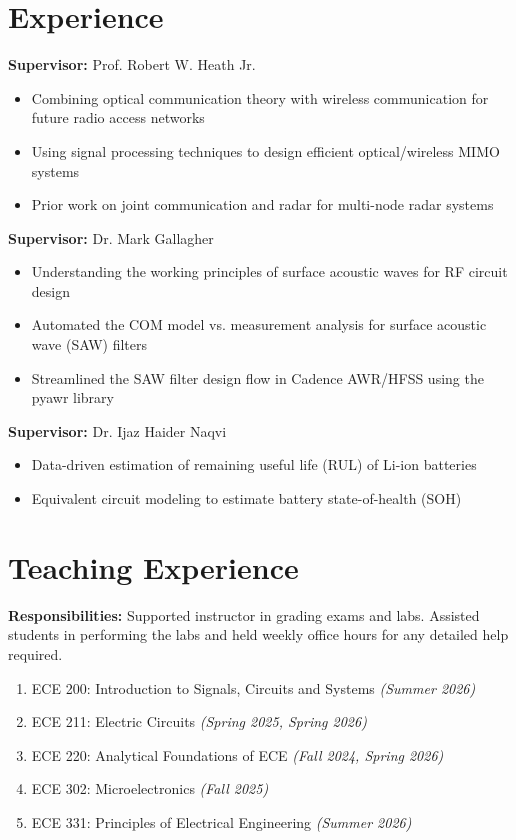 \documentclass[11pt,a4paper,sans]{moderncv}        %
\begin{document}
\section{Experience}

\textbf{Supervisor:} Prof. Robert W. Heath Jr.
\begin{itemize}
    \item Combining optical communication theory with wireless communication for future radio access networks
    \item Using signal processing techniques to design efficient optical/wireless MIMO systems
    \item Prior work on joint communication and radar for multi-node radar systems
\end{itemize}

\textbf{Supervisor:} Dr. Mark Gallagher
\begin{itemize}
    \item Understanding the working principles of surface acoustic waves for RF circuit design
    \item Automated the COM model vs. measurement analysis for surface acoustic wave (SAW) filters
    \item Streamlined the SAW filter design flow in Cadence AWR/HFSS using the pyawr library
\end{itemize}

\textbf{Supervisor:} Dr. Ijaz Haider Naqvi
\begin{itemize}
    \item Data-driven estimation of remaining useful life (RUL) of Li-ion batteries
    \item Equivalent circuit modeling to estimate battery state-of-health (SOH)
\end{itemize}


\section{Teaching Experience}
\textbf{Responsibilities:} Supported instructor in grading exams and labs. Assisted students in performing the labs and held weekly office hours for any detailed help required.
\begin{enumerate}
    \item ECE 200: Introduction to Signals, Circuits and Systems \textit{(Summer 2026)}
    \item ECE 211: Electric Circuits \textit{(Spring 2025, Spring 2026)}
    \item ECE 220: Analytical Foundations of ECE \textit{(Fall 2024, Spring 2026)}
    \item ECE 302: Microelectronics \textit{(Fall 2025)}
    \item ECE 331: Principles of Electrical Engineering \textit{(Summer 2026)}
\end{enumerate}
\end{document}
